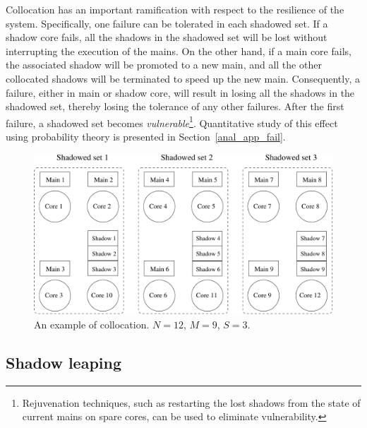 Collocation has an important ramification with respect to the resilience of the system. Specifically, 
one failure can be tolerated in each shadowed set. If a shadow core fails, all the shadows in the 
shadowed set will be lost without interrupting the execution of the mains. 
On the other hand, if a main core fails, the associated shadow will be promoted to a new main, and all 
the other collocated shadows will be terminated to speed up the new main.
Consequently, a failure, either in main or shadow core, will result in losing all the shadows in the shadowed set, thereby losing the tolerance of any other failures. After the first failure, a shadowed set becomes \emph{vulnerable}\footnote{Rejuvenation techniques, such as restarting the lost shadows from the state of current mains on spare cores, can be used to eliminate vulnerability.}. 
Quantitative study of this effect using probability theory is presented in Section~\ref{anal_app_fail}. %
 
\begin{figure}[!t]
  \begin{center}
    \includegraphics[width=\columnwidth]{Figures/sc_mapping.pdf}
  \end{center}
  \caption{An example of collocation. $N=12$, $M=9$, $S=3$.}
  \label{fig:sc_mapping}
\end{figure}




\subsection {Shadow leaping}
\label{sec:leaping_shadows}

